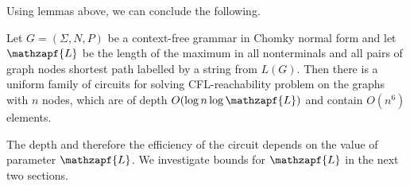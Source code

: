 Using lemmas above, we can conclude the following.
\begin{corollary}
\label{coldepth}
Let $G = (\Sigma, N, P)$ be a context-free grammar in Chomky normal form and let $\mathzapf{L}$ be the length of the maximum in all nonterminals and all pairs of graph nodes shortest path labelled by a string from $L(G)$. Then there is a uniform family of circuits for solving CFL-reachability problem on the graphs with $n$ nodes, which are of depth $O(\log n \log \mathzapf{L})$ and contain $O(n^6)$ elements.
\end{corollary}


The depth and therefore the efficiency of the circuit depends on the value of parameter $\mathzapf{L}$. We investigate bounds for $\mathzapf{L}$ in the next two sections.
